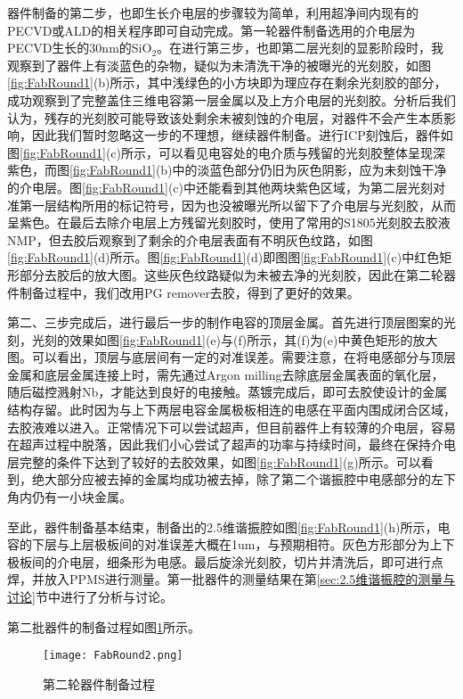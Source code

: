             器件制备的第二步，也即生长介电层的步骤较为简单，利用超净间内现有的PECVD或ALD的相关程序即可自动完成。第一轮器件制备选用的介电层为PECVD生长的30nm的SiO$_2$。在进行第三步，也即第二层光刻的显影阶段时，我观察到了器件上有淡蓝色的杂物，疑似为未清洗干净的被曝光的光刻胶，如图\ref{fig:FabRound1}(b)所示，其中浅绿色的小方块即为理应存在剩余光刻胶的部分，成功观察到了完整盖住三维电容第一层金属以及上方介电层的光刻胶。分析后我们认为，残存的光刻胶可能导致该处剩余未被刻蚀的介电层，对器件不会产生本质影响，因此我们暂时忽略这一步的不理想，继续器件制备。进行ICP刻蚀后，器件如图\ref{fig:FabRound1}(c)所示，可以看见电容处的电介质与残留的光刻胶整体呈现深紫色，而图\ref{fig:FabRound1}(b)中的淡蓝色部分仍旧为灰色阴影，应为未刻蚀干净的介电层。图\ref{fig:FabRound1}(c)中还能看到其他两块紫色区域，为第二层光刻对准第一层结构所用的标记符号，因为也没被曝光所以留下了介电层与光刻胶，从而呈紫色。在最后去除介电层上方残留光刻胶时，使用了常用的S1805光刻胶去胶液NMP，但去胶后观察到了剩余的介电层表面有不明灰色纹路，如图\ref{fig:FabRound1}(d)所示。图\ref{fig:FabRound1}(d)即图图\ref{fig:FabRound1}(c)中红色矩形部分去胶后的放大图。这些灰色纹路疑似为未被去净的光刻胶，因此在第二轮器件制备过程中，我们改用PG remover去胶，得到了更好的效果。

            第二、三步完成后，进行最后一步的制作电容的顶层金属。首先进行顶层图案的光刻，光刻的效果如图\ref{fig:FabRound1}(e)与(f)所示，其(f)为(e)中黄色矩形的放大图。可以看出，顶层与底层间有一定的对准误差。需要注意，在将电感部分与顶层金属和底层金属连接上时，需先通过Argon milling去除底层金属表面的氧化层，随后磁控溅射Nb，才能达到良好的电接触。蒸镀完成后，即可去胶使设计的金属结构存留。此时因为与上下两层电容金属极板相连的电感在平面内围成闭合区域，去胶液难以进入。正常情况下可以尝试超声，但目前器件上有较薄的介电层，容易在超声过程中脱落，因此我们小心尝试了超声的功率与持续时间，最终在保持介电层完整的条件下达到了较好的去胶效果，如图\ref{fig:FabRound1}(g)所示。可以看到，绝大部分应被去掉的金属均成功被去掉，除了第二个谐振腔中电感部分的左下角内仍有一小块金属。

            至此，器件制备基本结束，制备出的2.5维谐振腔如图\ref{fig:FabRound1}(h)所示，电容的下层与上层极板间的对准误差大概在1um，与预期相符。灰色方形部分为上下极板间的介电层，细条形为电感。最后旋涂光刻胶，切片并清洗后，即可进行点焊，并放入PPMS进行测量。第一批器件的测量结果在第\ref{sec:2.5维谐振腔的测量与讨论}节中进行了分析与讨论。


            第二批器件的制备过程如图\ref{fig:FabRound2}所示。



            \begin{figure}[h]
                \centering
                \texttt{[image: FabRound2.png]}
                \caption{第二轮器件制备过程}
                \label{fig:FabRound2}
            \end{figure}

